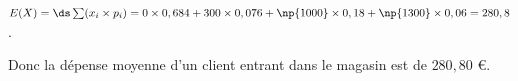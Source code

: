\begin{enumerate}
\begin{enumerate}
$E(X)=\ds\sum (x_i\times p_i) = 0\times 0,684 + 300\times 0,076 + \np{1000}\times 0,18 + \np{1300}\times 0,06 =280,8$.


Donc la dépense moyenne d'un client entrant dans le magasin est de $280,80$ \euro.
	\end{enumerate}
\end{enumerate}

\vspace{0.5cm}
